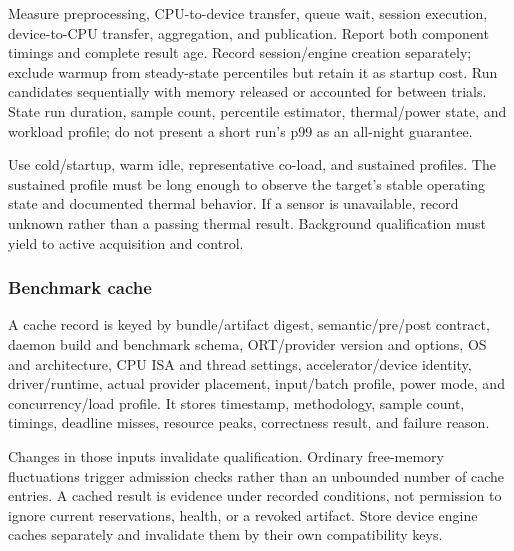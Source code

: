 \documentclass[11pt,a4paper]{article}
\begin{document}
Measure preprocessing, CPU-to-device transfer, queue wait, session execution,
device-to-CPU transfer, aggregation, and publication. Report both component
timings and complete result age. Record session/engine creation separately;
exclude warmup from steady-state percentiles but retain it as startup cost.
Run candidates sequentially with memory released or accounted for between
trials. State run duration, sample count, percentile estimator, thermal/power
state, and workload profile; do not present a short run's p99 as an all-night
guarantee.

Use cold/startup, warm idle, representative co-load, and sustained profiles.
The sustained profile must be long enough to observe the target's stable
operating state and documented thermal behavior. If a sensor is unavailable,
record unknown rather than a passing thermal result. Background qualification
must yield to active acquisition and control.

\subsubsection{Benchmark cache}
A cache record is keyed by bundle/artifact digest, semantic/pre/post contract,
daemon build and benchmark schema, ORT/provider version and options, OS and
architecture, CPU ISA and thread settings, accelerator/device identity,
driver/runtime, actual provider placement, input/batch profile, power mode,
and concurrency/load profile. It stores timestamp, methodology, sample count,
timings, deadline misses, resource peaks, correctness result, and failure reason.

Changes in those inputs invalidate qualification. Ordinary free-memory
fluctuations trigger admission checks rather than an unbounded number of cache
entries. A cached result is evidence under recorded conditions, not permission
to ignore current reservations, health, or a revoked artifact. Store device
engine caches separately and invalidate them by their own compatibility keys.
\end{document}
